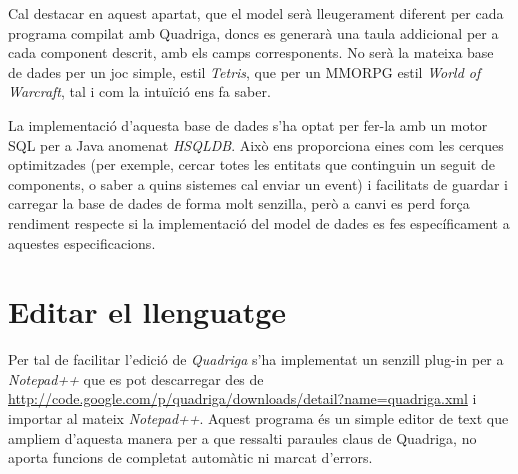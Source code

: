   Cal destacar en aquest apartat, que el model serà lleugerament diferent per cada programa compilat amb Quadriga, doncs es generarà una taula addicional per a cada component descrit, amb els camps corresponents. No serà la mateixa base de dades per un joc simple, estil {\em Tetris}, que per un MMORPG estil {\em World of Warcraft}, tal i com la intuïció ens fa saber.
  
  La implementació d'aquesta base de dades s'ha optat per fer-la amb un motor SQL per a Java anomenat {\em HSQLDB}. Això ens proporciona eines com les cerques optimitzades (per exemple, cercar totes les entitats que continguin un seguit de components, o saber a quins sistemes cal enviar un event) i facilitats de guardar i carregar la base de dades de forma molt senzilla, però a canvi es perd força rendiment respecte si la implementació del model de dades es fes específicament a aquestes especificacions.

\section{Editar el llenguatge}

  Per tal de facilitar l'edició de {\em Quadriga} s'ha implementat un senzill plug-in per a {\em Notepad++} que es pot descarregar des de \url{http://code.google.com/p/quadriga/downloads/detail?name=quadriga.xml} i importar al mateix {\em Notepad++}. Aquest programa és un simple editor de text que ampliem d'aquesta manera per a que ressalti paraules claus de Quadriga, no aporta funcions de completat automàtic ni marcat d'errors.